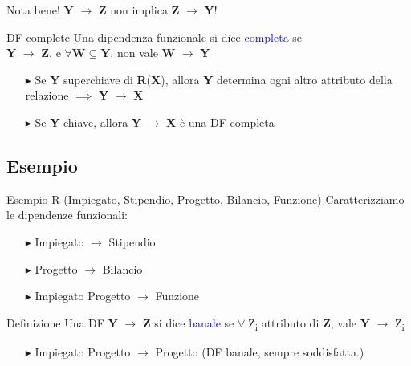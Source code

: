 \documentclass{beamer}
\begin{document}
\begin{frame}{}

    
    \begin{alertblock}{Nota bene!}
        \centering
        \textbf{Y} $\rightarrow$ \textbf{Z} non implica \textbf{Z} $\rightarrow$ \textbf{Y}!
    \end{alertblock}

    \begin{block}{DF complete}
        Una dipendenza funzionale si dice \textcolor{blue}{completa} se \\
        \centering
        \textbf{Y} $\rightarrow$ \textbf{Z}, e $\forall \textbf{W} \subseteq \textbf{Y}$, non vale \textbf{W} $\rightarrow$ \textbf{Y}
    \end{block}
    
    \begin{itemize}
        \item[$\blacktriangleright$] Se \textbf{Y} superchiave di \textbf{R}(\textbf{X}), allora \textbf{Y} determina ogni altro attributo della relazione $\implies$ \textbf{Y} $\rightarrow$ \textbf{X}
        \item[$\blacktriangleright$] Se \textbf{Y} chiave, allora \textbf{Y} $\rightarrow$ \textbf{X} è una DF completa
    \end{itemize}
    
\end{frame}

\subsection{Esempio}
\begin{frame}{Esempio}
    \Large R (\underline{Impiegato}, Stipendio, \underline{Progetto}, Bilancio, Funzione)
    \vfill
    \normalsize Caratterizziamo le dipendenze funzionali:
    \begin{itemize}
        \item[$\blacktriangleright$] Impiegato $\rightarrow$ Stipendio
        \item[$\blacktriangleright$] Progetto $\rightarrow$ Bilancio
        \item[$\blacktriangleright$] Impiegato Progetto $\rightarrow$ Funzione
    \end{itemize}

\begin{block}{Definizione}
    Una DF \textbf{Y} $\rightarrow$ \textbf{Z} si dice \textcolor{blue}{banale} se $\forall \;$Z\textsubscript{i} attributo di \textbf{Z}, vale \textbf{Y} $\rightarrow$ Z\textsubscript{i}
\end{block}
    
    \begin{itemize}
        \item[$\blacktriangleright$] Impiegato Progetto $\rightarrow$ Progetto
            (DF banale, sempre soddisfatta.)
    \end{itemize}

    
\end{frame}
\end{document}
